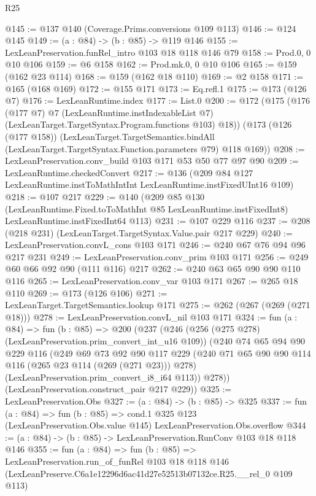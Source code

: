 \begin{lexlean}{R25}
\begin{coremodule}
@145 := @137 @140 (Coverage.Prims.conversions @109 @113)
@146 := @124 @145
@149 := (a : @84) -> (b : @85) -> @119 @146
@155 := LexLeanPreservation.funRel_intro @103 @18 @118 @146 @79
@158 := Prod.{0, 0} @10 @106
@159 := @6 @158
@162 := Prod.mk.{0, 0} @10 @106
@165 := @159 (@162 @23 @114)
@168 := @159 (@162 @18 @110)
@169 := @2 @158
@171 := @165 (@168 @169)
@172 := @155 @171
@173 := Eq.refl.{1}
@175 := @173 (@126 @7)
@176 := LexLeanRuntime.index
@177 := List.{0}
@200 := @172
    (@175
      (@176
        (@177 @7)
        @7
        (LexLeanRuntime.instIndexableList @7)
        (LexLeanTarget.TargetSyntax.Program.functions @103)
        @18))
    (@173
      (@126 (@177 @158))
      (LexLeanTarget.TargetSemantics.bindAll
        (LexLeanTarget.TargetSyntax.Function.parameters @79)
        @118
        @169))
@208 := LexLeanPreservation.conv_build @103 @171 @53 @50 @77 @97 @90
@209 := LexLeanRuntime.checkedConvert
@217 := @136 (@209 @84 @127 LexLeanRuntime.instToMathIntInt LexLeanRuntime.instFixedUInt16 @109)
@218 := @107 @217
@229 := @140
    (@209
      @85
      @130
      (LexLeanRuntime.Fixed.toToMathInt @85 LexLeanRuntime.instFixedInt8)
      LexLeanRuntime.instFixedInt64
      @113)
@231 := @107 @229 @116
@237 := @208 (@218 @231) (LexLeanTarget.TargetSyntax.Value.pair @217 @229)
@240 := LexLeanPreservation.convL_cons @103 @171
@246 := @240 @67 @76 @94 @96 @217 @231
@249 := LexLeanPreservation.conv_prim @103 @171
@256 := @249 @60 @66 @92 @90 (@111 @116) @217
@262 := @240 @63 @65 @90 @90 @110 @116
@265 := LexLeanPreservation.conv_var @103 @171
@267 := @265 @18 @110
@269 := @173 (@126 @106)
@271 := LexLeanTarget.TargetSemantics.lookup @171
@275 := @262 (@267 (@269 (@271 @18)))
@278 := LexLeanPreservation.convL_nil @103 @171
@324 := fun (a : @84) =>
  fun (b : @85) =>
  @200
    (@237
      (@246
        (@256 (@275 @278) (LexLeanPreservation.prim_convert_int_u16 @109))
        (@240
          @74
          @65
          @94
          @90
          @229
          @116
          (@249
            @69
            @73
            @92
            @90
            @117
            @229
            (@240 @71 @65 @90 @90 @114 @116 (@265 @23 @114 (@269 (@271 @23))) @278)
            (LexLeanPreservation.prim_convert_i8_i64 @113))
          @278))
      (LexLeanPreservation.construct_pair @217 @229))
@325 := LexLeanPreservation.Obs
@327 := (a : @84) -> (b : @85) -> @325
@337 := fun (a : @84) =>
  fun (b : @85) =>
  cond.{1} @325 @123 (LexLeanPreservation.Obs.value @145) LexLeanPreservation.Obs.overflow
@344 := (a : @84) -> (b : @85) -> LexLeanPreservation.RunConv @103 @18 @118 @146
@355 := fun (a : @84) =>
  fun (b : @85) =>
  LexLeanPreservation.run_of_funRel
    @103
    @18
    @118
    @146
    (LexLeanPreserve.C6a1e12296d6ac41d27e52513b07132ce.R25.__rel_0 @109 @113)
\end{coremodule}
\end{lexlean}
